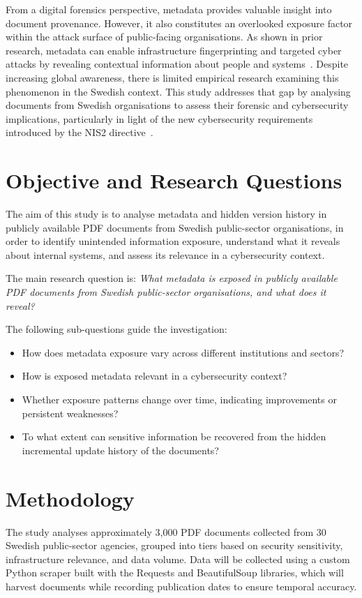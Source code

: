 \documentclass[conference]{IEEEtran}
\begin{document}
From a digital forensics perspective, metadata provides valuable insight into document provenance. However, it also constitutes an overlooked exposure factor within the attack surface of public-facing organisations. As shown in prior research, metadata can enable infrastructure fingerprinting and targeted cyber attacks by revealing contextual information about people and systems~\cite{b2}. Despite increasing global awareness, there is limited empirical research examining this phenomenon in the Swedish context. This study addresses that gap by analysing documents from Swedish organisations to assess their forensic and cybersecurity implications, particularly in light of the new cybersecurity requirements introduced by the NIS2 directive~\cite{b3}.

\section{Objective and Research Questions}

The aim of this study is to analyse metadata and hidden version history in publicly available PDF documents from Swedish public-sector organisations, in order to identify unintended information exposure, understand what it reveals about internal systems, and assess its relevance in a cybersecurity context.

The main research question is: \textit{What metadata is exposed in publicly available PDF documents from Swedish public-sector organisations, and what does it reveal?}

The following sub-questions guide the investigation:
\begin{itemize}
    \item How does metadata exposure vary across different institutions and sectors?
    \item How is exposed metadata relevant in a cybersecurity context?
    \item Whether exposure patterns change over time, indicating improvements or persistent weaknesses?
    \item To what extent can sensitive information be recovered from the hidden incremental update history of the documents?
\end{itemize}

\section{Methodology}

The study analyses approximately 3,000 PDF documents collected from 30 Swedish public-sector agencies, grouped into tiers based on security sensitivity, infrastructure relevance, and data volume. Data will be collected using a custom Python scraper built with the Requests and BeautifulSoup libraries, which will harvest documents while recording publication dates to ensure temporal accuracy.
\end{document}
